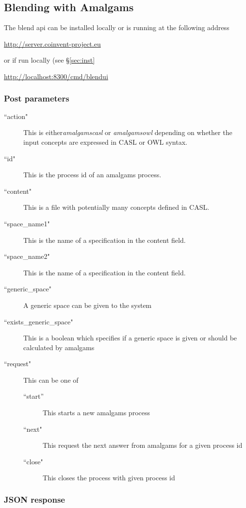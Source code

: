 \subsection{Blending with Amalgams} \label{sec:amal}

The blend api can be installed locally or is running at the following address
\begin{center}
\url{http://server.coinvent-project.eu}
\end{center}
\noindent or if run locally (see \S\ref{sec:inst}
\begin{center}
\url{http://localhost:8300/cmd/blendui}
\end{center}

\subsubsection{Post parameters}

\begin{description}
\item[``action"] This is either{\em amalgamscasl} or {\em amalgamsowl} depending on whether the input concepts are expressed in CASL or OWL syntax.
\item[``id"] This is the process id of an amalgams process.
\item[``content"] This is a file with potentially many concepts defined in CASL.
\item[``space\_name1"]  This is the name of a specification in the content field.
\item[``space\_name2"] This is the name of a specification in the content field.
\item[``generic\_space"] A generic space can be given to the system
\item[``exists\_generic\_space"] This is a boolean which specifies if a generic space is given or should be calculated by amalgams
\item[``request"] This can be one of
\begin{description}
\item[``start''] This starts a new amalgams process
\item[``next"] This request the next answer from amalgams for a given process id
\item[``close"] This closes the process with given process id
\end{description}
\end{description}

\subsubsection{JSON response}

